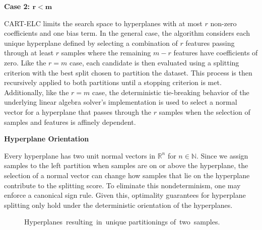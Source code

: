 \documentclass[10pt]{article} %
\begin{document}
\textbf{Case 2: $\mathbf{r < m}$}

\begin{adjustwidth}{1em}{1em}

	CART-ELC limits the search space to hyperplanes with at most $r$ non-zero coefficients and one bias term. In the general case, the algorithm considers each unique hyperplane defined by selecting a combination of $r$ features passing through at least $r$ samples where the remaining $m-r$ features have coefficients of zero. Like the $r=m$ case, each candidate is then evaluated using a splitting criterion with the best split chosen to partition the dataset. This process is then recursively applied to both partitions until a stopping criterion is met. Additionally, like the $r=m$ case, the deterministic tie-breaking behavior of the underlying linear algebra solver's implementation is used to select a normal vector for a hyperplane that passes through the $r$ samples when the selection of samples and features is affinely dependent.

\end{adjustwidth}

\textbf{Hyperplane Orientation}

\begin{adjustwidth}{1em}{1em}

	Every hyperplane has two unit normal vectors in $\mathbb{R}^n$ for $n \in \mathbb{N}$.  Since we assign samples to the left partition when samples are on or above the hyperplane, the selection of a normal vector can change how samples that lie on the hyperplane contribute to the splitting score. To eliminate this nondeterminism, one may enforce a canonical sign rule. %
Given this, optimality guarantees for hyperplane splitting only hold under the deterministic orientation of the hyperplanes.

\end{adjustwidth}

\begin{figure}[h]
    \centering
        \centering
        \caption{Hyperplanes resulting in unique partitionings of two samples.}
		\label{fig:hyper}
\end{figure}
\end{document}
